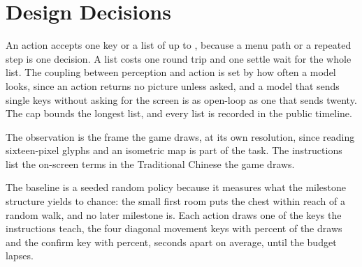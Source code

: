 \documentclass{article} %
\begin{document}
\begin{table}[!htb]
\centering
\caption{Each milestone in the \NsessionsPlayed{} hour sessions of the models: the sessions that reached it and the median action count and minute at which they did; in the order of \cref{fig:ladder}; a dash marks a milestone no session reached.}
\label{tab:milestones}
\footnotesize

\end{table}

\begin{table}[!htb]
\centering
\caption{The four-hour sessions that count, one row per session: the minute of the last key, the actions sent, the minute at which each milestone was first reached, in the order of \cref{fig:ladder}, and the milestones credited. The crossing is timed by the service and the other milestones by the replay; a dash marks a milestone not reached.}
\label{tab:long}
\footnotesize
\setlength{\tabcolsep}{1.5pt}
\resizebox{\linewidth}{!}{}
\end{table}

\section{Design Decisions}
\label{app:design}

An action accepts one key or a list of up to \MmaxKeys{}, because a menu path or a repeated step is one decision. A list costs one round trip and one settle wait for the whole list. The coupling between perception and action is set by how often a model looks, since an action returns no picture unless asked, and a model that sends single keys without asking for the screen is as open-loop as one that sends twenty. The cap bounds the longest list, and every list is recorded in the public timeline.

The observation is the frame the game draws, at its own resolution, since reading sixteen-pixel glyphs and an isometric map is part of the task. The instructions list the on-screen terms in the Traditional Chinese the game draws.

The baseline is a seeded random policy because it measures what the milestone structure yields to chance: the small first room puts the chest within reach of a random walk, and no later milestone is. Each action draws one of the \QrandomKeys{} keys the instructions teach, the four diagonal movement keys with \QrandomMoveShare{} percent of the draws and the confirm key with \QrandomEnterShare{} percent, \QrandomPace{} seconds apart on average, until the budget lapses.
\end{document}
